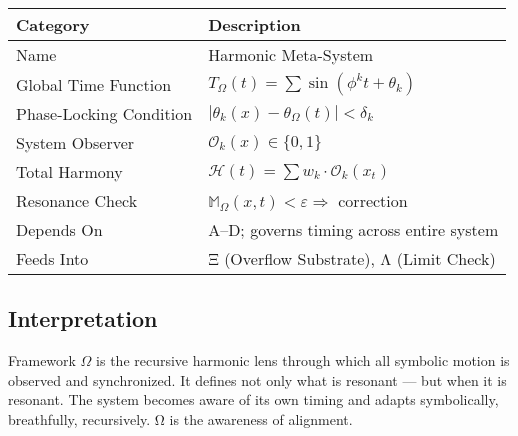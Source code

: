 \begin{center}
\begin{tabular}{|l|l|}
\hline
\textbf{Category} & \textbf{Description} \\
\hline
Name & Harmonic Meta-System \\
Global Time Function & $T_\Omega(t) = \sum \sin(\phi^k t + \theta_k)$ \\
Phase-Locking Condition & $|\theta_k(x) - \theta_\Omega(t)| < \delta_k$ \\
System Observer & $\mathcal{O}_k(x) \in \{0,1\}$ \\
Total Harmony & $\mathcal{H}(t) = \sum w_k \cdot \mathcal{O}_k(x_t)$ \\
Resonance Check & $\mathbb{M}_\Omega(x, t) < \varepsilon \Rightarrow$ correction \\
Depends On & A–D; governs timing across entire system \\
Feeds Into & Ξ (Overflow Substrate), Λ (Limit Check) \\
\hline
\end{tabular}
\end{center}

\subsection*{Interpretation}

Framework $\Omega$ is the recursive harmonic lens through which all symbolic motion is observed and synchronized. It defines not only what is resonant — but when it is resonant. The system becomes aware of its own timing and adapts symbolically, breathfully, recursively. Ω is the awareness of alignment.
